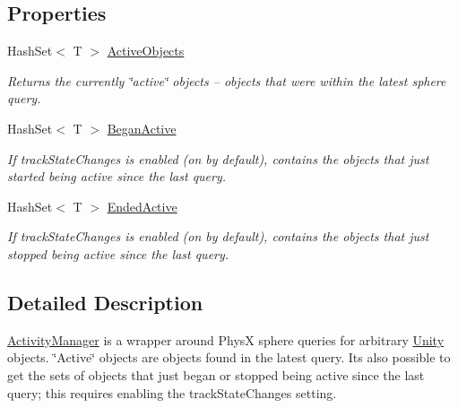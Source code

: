 \subsection*{Properties}
\begin{DoxyCompactItemize}
\item 
Hash\+Set$<$ T $>$ \mbox{\hyperlink{class_leap_1_1_unity_1_1_interaction_1_1_activity_manager_a6eb798f1ce61155a8ae329cf61d750df}{Active\+Objects}}
\begin{DoxyCompactList}\small\item\em Returns the currently \char`\"{}active\char`\"{} objects -- objects that were within the latest sphere query. \end{DoxyCompactList}\item 
Hash\+Set$<$ T $>$ \mbox{\hyperlink{class_leap_1_1_unity_1_1_interaction_1_1_activity_manager_ac60a3543eabcf6162b4ded1d28e5fc0b}{Began\+Active}}
\begin{DoxyCompactList}\small\item\em If track\+State\+Changes is enabled (on by default), contains the objects that just started being active since the last query. \end{DoxyCompactList}\item 
Hash\+Set$<$ T $>$ \mbox{\hyperlink{class_leap_1_1_unity_1_1_interaction_1_1_activity_manager_a8bb4ce485e63f6a02ddb97f8c420b72a}{Ended\+Active}}
\begin{DoxyCompactList}\small\item\em If track\+State\+Changes is enabled (on by default), contains the objects that just stopped being active since the last query. \end{DoxyCompactList}\end{DoxyCompactItemize}


\subsection{Detailed Description}
\mbox{\hyperlink{class_leap_1_1_unity_1_1_interaction_1_1_activity_manager}{Activity\+Manager}} is a wrapper around PhysX sphere queries for arbitrary \mbox{\hyperlink{namespace_leap_1_1_unity}{Unity}} objects. \char`\"{}\+Active\char`\"{} objects are objects found in the latest query. It\textquotesingle{}s also possible to get the sets of objects that just began or stopped being active since the last query; this requires enabling the track\+State\+Changes setting. 



